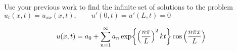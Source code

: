 Use your previous work to find the infinite set of solutions to the problem \\ $u_t(x,t) = u_{xx}(x,t), \qquad u'(0,t) = u'(L,t) = 0$

\soln*
$$u(x,t) = a_0 + \sumn{1} a_n \exp{\pfrac{\np}{L}^2 kt } \cosp{\npxl}$$